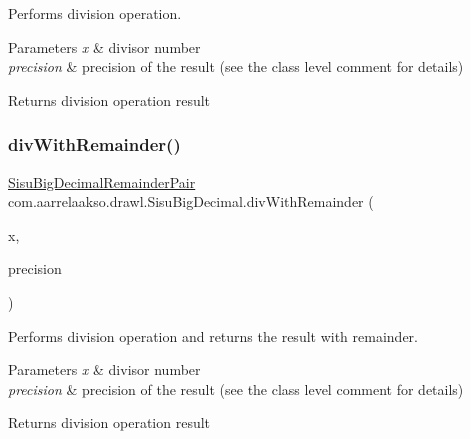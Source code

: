 Performs division operation.


\begin{DoxyParams}{Parameters}
{\em x} & divisor number \\
\hline
{\em precision} & precision of the result (see the class level comment for details) \\
\hline
\end{DoxyParams}
\begin{DoxyReturn}{Returns}
division operation result 
\end{DoxyReturn}
\mbox{\label{classcom_1_1aarrelaakso_1_1drawl_1_1_sisu_big_decimal_a21e09234efca516798b5bd745fccad41}} 
\subsubsection{\texorpdfstring{div\+With\+Remainder()}{divWithRemainder()}\hspace{0.1cm}{\footnotesize\ttfamily [1/2]}}
{\footnotesize\ttfamily \hyperlink{classcom_1_1aarrelaakso_1_1drawl_1_1_sisu_big_decimal_remainder_pair}{Sisu\+Big\+Decimal\+Remainder\+Pair} com.\+aarrelaakso.\+drawl.\+Sisu\+Big\+Decimal.\+div\+With\+Remainder (\begin{DoxyParamCaption}\item[{\hyperlink{classcom_1_1aarrelaakso_1_1drawl_1_1_sisu_big_decimal}{Sisu\+Big\+Decimal}}]{x,  }\item[{int}]{precision }\end{DoxyParamCaption})\hspace{0.3cm}{\ttfamily [protected]}}

Performs division operation and returns the result with remainder.


\begin{DoxyParams}{Parameters}
{\em x} & divisor number \\
\hline
{\em precision} & precision of the result (see the class level comment for details) \\
\hline
\end{DoxyParams}
\begin{DoxyReturn}{Returns}
division operation result 
\end{DoxyReturn}
\mbox{\label{classcom_1_1aarrelaakso_1_1drawl_1_1_sisu_big_decimal_a8707dfd3e59cee5e599d6a8a469b7f0d}} 
